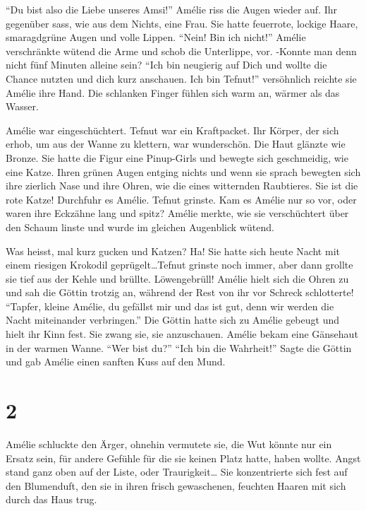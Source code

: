 \documentclass[11pt,titlepage,a5paper]{book}
\begin{document}
"`Du bist also die Liebe unseres Amsi!"' Amélie riss die Augen wieder auf. Ihr gegenüber sass, wie aus dem Nichts, eine Frau. Sie hatte feuerrote, lockige Haare, smaragdgrüne Augen und volle Lippen. "`Nein! Bin ich nicht!"' Amélie verschränkte wütend die Arme und schob die Unterlippe, vor. -Konnte man denn nicht fünf Minuten alleine sein? "`Ich bin neugierig auf Dich und wollte die Chance nutzten und dich kurz anschauen. Ich bin Tefnut!"' versöhnlich reichte sie Amélie ihre Hand. Die schlanken Finger fühlen sich warm an, wärmer als das Wasser. 

Amélie war eingeschüchtert. Tefnut war ein Kraftpacket. Ihr Körper, der sich erhob, um aus der Wanne zu klettern, war wunderschön. Die Haut glänzte wie Bronze. Sie hatte die Figur eine Pinup-Girls und bewegte sich geschmeidig, wie eine Katze. Ihren grünen Augen entging nichts und wenn sie sprach bewegten sich ihre zierlich Nase und ihre Ohren, wie die eines witternden Raubtieres. Sie ist die rote Katze! Durchfuhr es Amélie. Tefnut grinste. Kam es Amélie nur so vor, oder waren ihre Eckzähne lang und spitz? Amélie merkte, wie sie verschüchtert über den Schaum linste und wurde im gleichen Augenblick wütend. 

Was heisst, mal kurz gucken und Katzen? Ha! Sie hatte sich heute Nacht mit einem riesigen Krokodil geprügelt\dots Tefnut grinste noch immer, aber dann grollte sie tief aus der Kehle und brüllte. Löwengebrüll! Amélie hielt sich die Ohren zu und sah die Göttin trotzig an, während der Rest von ihr vor Schreck schlotterte! "`Tapfer, kleine Amélie, du gefällst mir und das ist gut, denn wir werden die Nacht miteinander verbringen."' Die Göttin hatte sich zu Amélie gebeugt und hielt ihr Kinn fest. Sie zwang sie, sie anzuschauen. Amélie bekam eine Gänsehaut in der warmen Wanne. "`Wer bist du?"' "`Ich bin die Wahrheit!"' Sagte die Göttin und gab Amélie einen sanften Kuss auf den Mund.

\section*{2}


Amélie schluckte den Ärger, ohnehin vermutete sie, die Wut könnte nur ein Ersatz sein, für andere Gefühle für die sie keinen Platz hatte, haben wollte. Angst stand ganz oben auf der Liste, oder Traurigkeit\dots
Sie konzentrierte sich fest auf den Blumenduft, den sie in ihren frisch gewaschenen, feuchten Haaren mit sich durch das Haus trug. 
\end{document}

